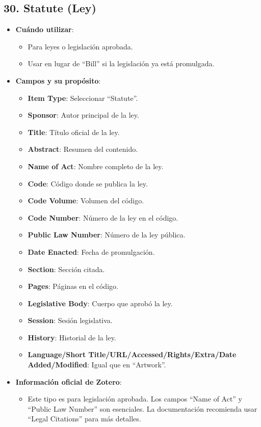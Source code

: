 \documentclass[
  jou,
  floatsintext,
  longtable,
  a4paper,
  nolmodern,
  notxfonts,
  notimes,
  colorlinks=true,linkcolor=blue,citecolor=blue,urlcolor=blue]{apa7}
\providecommand{\tightlist}{%
  \setlength{\itemsep}{0pt}\setlength{\parskip}{0pt}}
\begin{document}
\subsection{30. Statute (Ley)}\label{statute-ley}

\begin{itemize}
\tightlist
\item
  \textbf{Cuándo utilizar}:

  \begin{itemize}
  \tightlist
  \item
    Para leyes o legislación aprobada.
  \item
    Usar en lugar de ``Bill'' si la legislación ya está promulgada.
  \end{itemize}
\item
  \textbf{Campos y su propósito}:

  \begin{itemize}
  \tightlist
  \item
    \textbf{Item Type}: Seleccionar ``Statute''.
  \item
    \textbf{Sponsor}: Autor principal de la ley.
  \item
    \textbf{Title}: Título oficial de la ley.
  \item
    \textbf{Abstract}: Resumen del contenido.
  \item
    \textbf{Name of Act}: Nombre completo de la ley.
  \item
    \textbf{Code}: Código donde se publica la ley.
  \item
    \textbf{Code Volume}: Volumen del código.
  \item
    \textbf{Code Number}: Número de la ley en el código.
  \item
    \textbf{Public Law Number}: Número de la ley pública.
  \item
    \textbf{Date Enacted}: Fecha de promulgación.
  \item
    \textbf{Section}: Sección citada.
  \item
    \textbf{Pages}: Páginas en el código.
  \item
    \textbf{Legislative Body}: Cuerpo que aprobó la ley.
  \item
    \textbf{Session}: Sesión legislativa.
  \item
    \textbf{History}: Historial de la ley.
  \item
    \textbf{Language/Short Title/URL/Accessed/Rights/Extra/Date
    Added/Modified}: Igual que en ``Artwork''.
  \end{itemize}
\item
  \textbf{Información oficial de Zotero}:

  \begin{itemize}
  \tightlist
  \item
    Este tipo es para legislación aprobada. Los campos ``Name of Act'' y
    ``Public Law Number'' son esenciales. La documentación recomienda
    usar ``Legal Citations'' para más detalles.
  \end{itemize}
\end{itemize}
\end{document}
